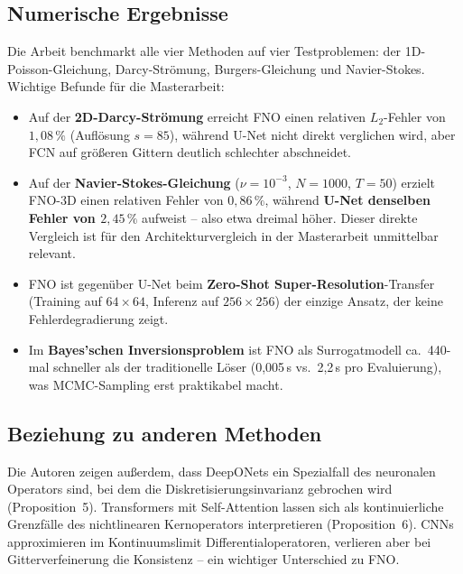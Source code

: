 \documentclass[a4paper,12pt]{article}
\begin{document}
\subsection*{Numerische Ergebnisse}

Die Arbeit benchmarkt alle vier Methoden auf vier Testproblemen: der
1D-Poisson-Gleichung, Darcy-Strömung, Burgers-Gleichung und Navier-Stokes.
Wichtige Befunde für die Masterarbeit:

\begin{itemize}
  \item Auf der \textbf{2D-Darcy-Strömung} erreicht FNO einen relativen $L_2$-Fehler
        von $1{,}08\,\%$ (Auflösung $s=85$), während U-Net nicht direkt verglichen
        wird, aber FCN auf größeren Gittern deutlich schlechter abschneidet.
  \item Auf der \textbf{Navier-Stokes-Gleichung} ($\nu = 10^{-3}$, $N=1000$,
        $T=50$) erzielt FNO-3D einen relativen Fehler von $0{,}86\,\%$, während
        \textbf{U-Net denselben Fehler von $2{,}45\,\%$} aufweist -- also etwa
        dreimal höher. Dieser direkte Vergleich ist für den Architekturvergleich
        in der Masterarbeit unmittelbar relevant.
  \item FNO ist gegenüber U-Net beim \textbf{Zero-Shot Super-Resolution}-Transfer
        (Training auf $64{\times}64$, Inferenz auf $256{\times}256$) der einzige
        Ansatz, der keine Fehlerdegradierung zeigt.
  \item Im \textbf{Bayes'schen Inversionsproblem} ist FNO als Surrogatmodell
        ca.\ 440-mal schneller als der traditionelle Löser (0,005\,s vs.\ 2,2\,s
        pro Evaluierung), was MCMC-Sampling erst praktikabel macht.
\end{itemize}

\subsection*{Beziehung zu anderen Methoden}

Die Autoren zeigen außerdem, dass DeepONets ein Spezialfall des
neuronalen Operators sind, bei dem die Diskretisierungsinvarianz gebrochen wird
(Proposition~5). Transformers mit Self-Attention lassen sich als kontinuierliche
Grenzfälle des nichtlinearen Kernoperators interpretieren (Proposition~6).
CNNs approximieren im Kontinuumslimit Differentialoperatoren, verlieren aber
bei Gitterverfeinerung die Konsistenz -- ein wichtiger Unterschied zu FNO.
\end{document}
